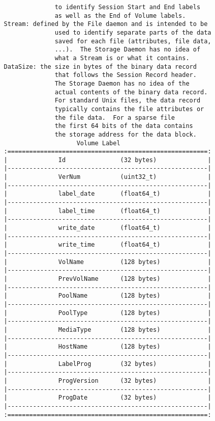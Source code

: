 \begin{verbatim}
                 to identify Session Start and End labels
                 as well as the End of Volume labels.
   Stream: defined by the File daemon and is intended to be
                 used to identify separate parts of the data
                 saved for each file (attributes, file data,
                 ...).  The Storage Daemon has no idea of
                 what a Stream is or what it contains.
   DataSize: the size in bytes of the binary data record
                 that follows the Session Record header.
                 The Storage Daemon has no idea of the
                 actual contents of the binary data record.
                 For standard Unix files, the data record
                 typically contains the file attributes or
                 the file data.  For a sparse file
                 the first 64 bits of the data contains
                 the storage address for the data block.
                       Volume Label
   :=======================================================:
   |              Id               (32 bytes)              |
   |-------------------------------------------------------|
   |              VerNum           (uint32_t)              |
   |-------------------------------------------------------|
   |              label_date       (float64_t)             |
   |-------------------------------------------------------|
   |              label_time       (float64_t)             |
   |-------------------------------------------------------|
   |              write_date       (float64_t)             |
   |-------------------------------------------------------|
   |              write_time       (float64_t)             |
   |-------------------------------------------------------|
   |              VolName          (128 bytes)             |
   |-------------------------------------------------------|
   |              PrevVolName      (128 bytes)             |
   |-------------------------------------------------------|
   |              PoolName         (128 bytes)             |
   |-------------------------------------------------------|
   |              PoolType         (128 bytes)             |
   |-------------------------------------------------------|
   |              MediaType        (128 bytes)             |
   |-------------------------------------------------------|
   |              HostName         (128 bytes)             |
   |-------------------------------------------------------|
   |              LabelProg        (32 bytes)              |
   |-------------------------------------------------------|
   |              ProgVersion      (32 bytes)              |
   |-------------------------------------------------------|
   |              ProgDate         (32 bytes)              |
   |-------------------------------------------------------|
   :=======================================================:
                 

\end{verbatim}
